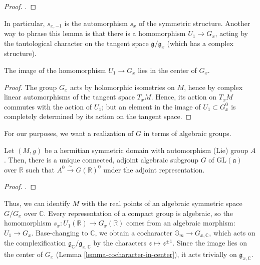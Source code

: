 \begin{proof}
 \cite[Theorem 1.9]{Milne-Shimura}.
\end{proof}


In particular, $s_{x,-1}$ is the automorphism $s_x$ of the symmetric structure. Another way to phrase this lemma is that there is a homomorphism $U_1\to G_x$, acting by the tautological character on the tangent space $\mathfrak g/\mathfrak g_x$ (which has a complex structure). 

\begin{lemma}
 \label{lemma-cocharacter-in-center}
The image of the homomorphism $U_1\to G_x$ lies in the center of $G_x$.
\end{lemma}

\begin{proof}
The group $G_x$ acts by holomorphic isometries on $M$, hence by complex linear automorphisms of the tangent space $T_x M$. Hence, its action on $T_x M$ commutes with the action of $U_1$; but an element in the image of $U_1\subset G_x^0$ is completely determined by its action on the tangent space.
\end{proof}



For our purposes, we want a realization of $G$ in terms of algebraic groups.

\begin{lemma}
 \label{lemma-hermitian-automorphisms-algebraic}
Let $(M,g)$ be a hermitian symmetric domain with automorphism (Lie) group $A$. Then, there is a unique connected, adjoint algebraic subgroup $G$ of $\text{GL}(\mathfrak a)$ over $\mathbb R$ such that $A^0 \xrightarrow\sim G(\mathbb R)^0$ under the adjoint representation.
\end{lemma}

\begin{proof}
 \cite[Proposition 1.7]{Milne-Shimura}.
\end{proof}

Thus, we can identify $M$ with the real points of an algebraic symmetric space $G/G_x$ over $\mathbb C$.
Every representation of a compact group is algebraic, so the homomorphism $s_x: U_1(\mathbb R) \to G_x(\mathbb R)$ comes from an algebraic morphism: $U_1 \to G_x$. Base-changing to $\mathbb C$, we obtain a cocharacter $\mathbb G_m \to G_{x,\mathbb C}$, which acts on the complexification $\mathfrak g_{\mathbb C}/\mathfrak g_{x,\mathbb C}$ by the characters $z\mapsto z^{\pm 1}$. Since the image lies on the center of $G_x$ (Lemma \ref{lemma-cocharacter-in-center}), it acts trivially on $\mathfrak g_{x,\mathbb C}$. 


